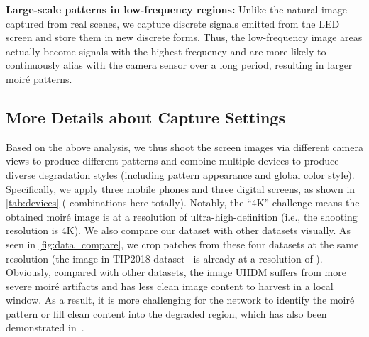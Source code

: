 \documentclass[runningheads]{llncs}
\newcommand{\ie}{i.e.}
\begin{document}
\noindent\textbf{Large-scale patterns in low-frequency regions:}
Unlike the natural image captured from real scenes, we capture discrete signals emitted from the LED screen and store them in new discrete forms. Thus, the low-frequency image areas actually become signals with the highest frequency and are more likely to continuously alias with the camera sensor over a long period, resulting in larger moiré patterns.

\subsection{More Details about Capture Settings}
Based on the above analysis, we thus shoot the screen images via different camera views to produce different patterns and combine multiple devices to produce diverse degradation styles (including pattern appearance and global color style). 
Specifically, we apply three mobile phones and three digital screens, as shown in \cref{tab:devices} ( combinations here totally). 
Notably, the ``4K'' challenge means the obtained moiré image is at a resolution of ultra-high-definition (\ie, the shooting resolution is 4K). We also compare our dataset with other datasets visually. As seen in \cref{fig:data_compare}, we crop patches from these four datasets at the same resolution  (the image in TIP2018 dataset~\cite{sun2018moire} is already at a resolution of ). Obviously, compared with other datasets, the image UHDM suffers from more severe moiré artifacts and has less clean image content to harvest in a local window. As a result, it is more challenging for the network to identify the moiré pattern or fill clean content into the degraded region, which has also been demonstrated in~\cite{he2020fhde}.    

\begin{table}
\caption{The capture devices we apply to get the moiré image}
\centering
{}

\label{tab:devices}
\end{table}
\end{document}
